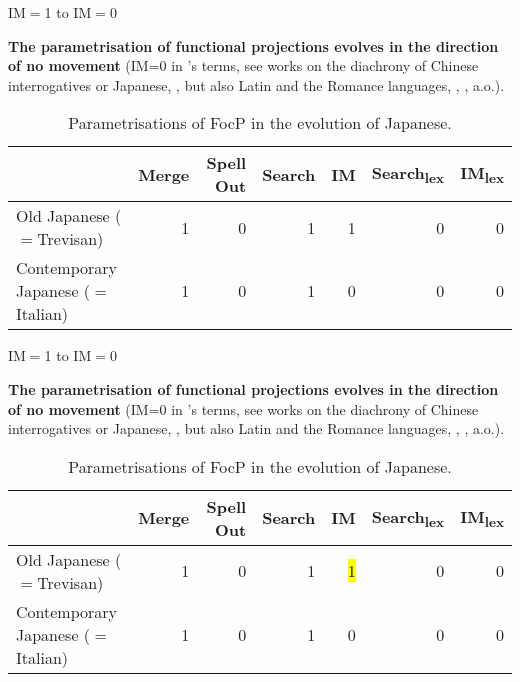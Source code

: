 \documentclass[lesson_slides]{subfiles}
\begin{document}
\begin{frame}[c]{IM$=$1 to IM$=$0}

\textbf{The parametrisation of functional projections evolves in the direction of no movement} (IM=0 in \citeauthor{rizzi2017}’s \citeyear{rizzi2017} terms, see works on the diachrony of Chinese interrogatives \citealt{aldridge2010clause} or Japanese, \citealt{aldridge2009old}, but also Latin and the Romance languages, \citealt{roberts2003syntactic}, \citealt{dadan2019}, a.o.).

\begin{table}[ht]
    \centering
    \begin{tabular}{|l|r|r|r|r|r|r|}
    \hline
     & Merge & Spell Out & Search & IM & Search\textsubscript{lex} & IM\textsubscript{lex} \\
    \hline
    Old Japanese ($=$Trevisan) & 1 & 0 & 1 & 1 & 0 & 0\\
    \hline
    Contemporary Japanese ($=$Italian) & 1 & 0 & 1 & 0 & 0 & 0 \\
    \hline
    \end{tabular}
    \caption{\label{tab:samp2}Parametrisations of FocP in the evolution of Japanese.}
    \end{table}

\end{frame}
\begin{frame}[c]{IM$=$1 to IM$=$0}

\textbf{The parametrisation of functional projections evolves in the direction of no movement} (IM=0 in \citeauthor{rizzi2017}’s \citeyear{rizzi2017} terms, see works on the diachrony of Chinese interrogatives \citealt{aldridge2010clause} or Japanese, \citealt{aldridge2009old}, but also Latin and the Romance languages, \citealt{roberts2003syntactic}, \citealt{dadan2019}, a.o.).

\begin{table}[ht]
    \centering
    \begin{tabular}{|l|r|r|r|r|r|r|}
    \hline
     & Merge & Spell Out & Search & IM & Search\textsubscript{lex} & IM\textsubscript{lex} \\
    \hline
    Old Japanese ($=$Trevisan) & 1 & 0 & 1 & \hl{1} & 0 & 0\\
    \hline
    Contemporary Japanese ($=$Italian) & 1 & 0 & 1 & 0 & 0 & 0 \\
    \hline
    \end{tabular}
    \caption{\label{tab:samp2}Parametrisations of FocP in the evolution of Japanese.}
    \end{table}

\end{frame}
\end{document}
